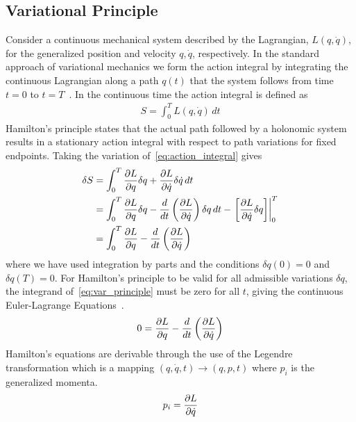 \documentclass[letterpaper, preprint, paper,11pt]{AAS}	%
\begin{document}
\subsection{Variational Principle}
Consider a continuous mechanical system described by the Lagrangian, \( L( q, \dot{q} ) \), for the generalized position and velocity \( q, \dot{q} \), respectively.
In the standard approach of variational mechanics we form the action integral by integrating the continuous Lagrangian along a path \( q(t) \) that the system follows from time \( t = 0 \) to \( t = T \)~\cite{greenwood1988}.
In the continuous time the action integral is defined as
\begin{align}\label{eq:action_integral}
	S = \int_{0}^T L\left( q, \dot{q}\right) \, dt
\end{align}
Hamilton's principle states that the actual path followed by a holonomic system results in a stationary action integral with respect to path variations for fixed endpoints.
Taking the variation of~\cref{eq:action_integral} gives
\begin{subequations}
\begin{align}\label{eq:var_principle}
	\delta S &= \int_{0}^T \deriv{L}{q} \delta q + \deriv{L}{\dot{q}} \delta \dot{q} \, dt \\
		&= \int_{0}^T \deriv{L}{q} \delta q - \frac{d}{dt} \left( \deriv{L}{\dot{q}}\right) \delta q \, dt - \left. \left[ \deriv{L}{\dot{q}} \delta q\right] \right|_0^T \\
	&= \int_{0}^T \deriv{L}{q} - \frac{d}{dt} \left( \deriv{L}{\dot{q}}	\right)
\end{align}
\end{subequations} 
where we have used integration by parts and the conditions \( \delta q(0) = 0 \) and \( \delta q(T) = 0\).
For Hamilton's principle to be valid for all admissible variations \( \delta q \), the integrand of~\cref{eq:var_principle} must be zero for all \( t\), giving the continuous Euler-Lagrange Equations~\cite{lanczos1970}.
\begin{align}\label{eq:euler-lagrange}
	0 = \deriv{L}{q} - \frac{d}{dt} \left( \deriv{L}{\dot{q}} \right) 
\end{align}
Hamilton's equations are derivable through the use of the Legendre transformation which is a mapping \( \left( q, \dot{q},t\right) \rightarrow \left(q, p, t \right) \) where \( p_i\) is the generalized momenta.
\begin{align}\label{eq:legendre_transform}
	p_i = \deriv{L}{\dot{q}}
\end{align}
\end{document}
